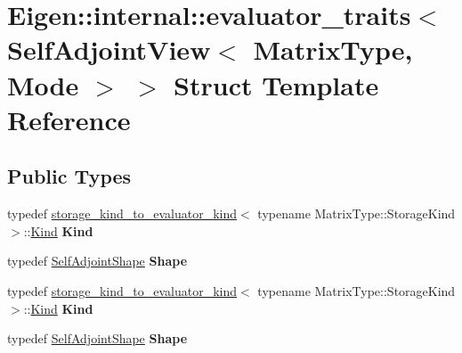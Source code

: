 \hypertarget{struct_eigen_1_1internal_1_1evaluator__traits_3_01_self_adjoint_view_3_01_matrix_type_00_01_mode_01_4_01_4}{}\section{Eigen\+:\+:internal\+:\+:evaluator\+\_\+traits$<$ Self\+Adjoint\+View$<$ Matrix\+Type, Mode $>$ $>$ Struct Template Reference}
\label{struct_eigen_1_1internal_1_1evaluator__traits_3_01_self_adjoint_view_3_01_matrix_type_00_01_mode_01_4_01_4}
\subsection*{Public Types}
\begin{DoxyCompactItemize}
\item 
\mbox{\label{struct_eigen_1_1internal_1_1evaluator__traits_3_01_self_adjoint_view_3_01_matrix_type_00_01_mode_01_4_01_4_a43e3797fae6cc08094826b7070f06c40}} 
typedef \hyperlink{struct_eigen_1_1internal_1_1storage__kind__to__evaluator__kind}{storage\+\_\+kind\+\_\+to\+\_\+evaluator\+\_\+kind}$<$ typename Matrix\+Type\+::\+Storage\+Kind $>$\+::\hyperlink{struct_eigen_1_1internal_1_1_index_based}{Kind} {\bfseries Kind}
\item 
\mbox{\label{struct_eigen_1_1internal_1_1evaluator__traits_3_01_self_adjoint_view_3_01_matrix_type_00_01_mode_01_4_01_4_ae7a1d5988e5a531663b25ff70e26376e}} 
typedef \hyperlink{struct_eigen_1_1_self_adjoint_shape}{Self\+Adjoint\+Shape} {\bfseries Shape}
\item 
\mbox{\label{struct_eigen_1_1internal_1_1evaluator__traits_3_01_self_adjoint_view_3_01_matrix_type_00_01_mode_01_4_01_4_a43e3797fae6cc08094826b7070f06c40}} 
typedef \hyperlink{struct_eigen_1_1internal_1_1storage__kind__to__evaluator__kind}{storage\+\_\+kind\+\_\+to\+\_\+evaluator\+\_\+kind}$<$ typename Matrix\+Type\+::\+Storage\+Kind $>$\+::\hyperlink{struct_eigen_1_1internal_1_1_index_based}{Kind} {\bfseries Kind}
\item 
\mbox{\label{struct_eigen_1_1internal_1_1evaluator__traits_3_01_self_adjoint_view_3_01_matrix_type_00_01_mode_01_4_01_4_ae7a1d5988e5a531663b25ff70e26376e}} 
typedef \hyperlink{struct_eigen_1_1_self_adjoint_shape}{Self\+Adjoint\+Shape} {\bfseries Shape}
\end{DoxyCompactItemize}


